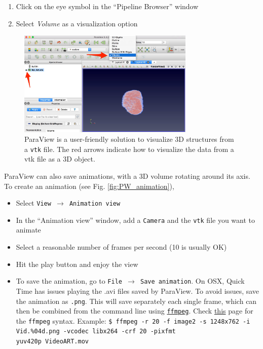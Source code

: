 \documentclass[11pt]{scrartcl}
\begin{document}
\begin{enumerate}
    \item Click on the eye symbol in the ``Pipeline Browser'' window
    \item Select {\emph{Volume}} as a visualization option 
\end{enumerate}

\begin{figure}[h]
    \centering
    \includegraphics[width=0.75\textwidth]{Paraview_manual.png}
    \caption{ParaView is a user-friendly solution to visualize {\footnotesize{3D}} structures from a {\texttt{vtk}} file. The red arrows indicate how to visualize the data from a vtk file as a {\footnotesize{3D}} object.}
    \label{fig:my_label}
\end{figure}

ParaView can also save animations, with a {\footnotesize{3D}} volume rotating around its axis. To create an animation (see Fig. \ref{fig:PW_animation}), 

\begin{itemize}
    \item Select {\texttt{View $\rightarrow$ Animation view}}
    \item In the ``Animation view'' window, add a {\texttt{Camera}} and the {\texttt{vtk}} file you want to animate
    \item Select a reasonable number of frames per second (10 is usually {\footnotesize{OK}})
    \item Hit the play button and enjoy the view
    \item To save the animation, go to {\texttt{File $\rightarrow$ Save animation}}. \danger On {\footnotesize{OSX}}, Quick Time has issues playing the .avi files saved by ParaView. To avoid issues, save the animation as {\texttt{.png}}. This will save separately each single frame, which can then be combined from the command line using \href{http://www.ffmpeg.org/download.html}{\texttt{ffmpeg}}. Check \href{http://hamelot.io/visualization/using-ffmpeg-to-convert-a-set-of-images-into-a-video/}{this} page for the {\texttt{ffmpeg}} syntax. Example: {\texttt{\$ ffmpeg -r 20 -f image2 -s 1248x762 -i Vid.\%04d.png -vcodec libx264 -crf 20 -pix\textunderscore fmt \\ yuv420p Video\textunderscore ART.mov}}
\end{itemize}
\end{document}
